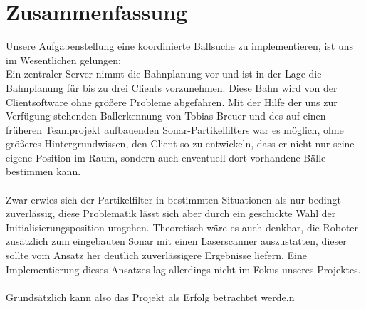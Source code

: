 
\chapter{Zusammenfassung}
\label{cha:zusammenfassung}
Unsere Aufgabenstellung eine koordinierte Ballsuche 
zu implementieren, ist uns im Wesentlichen gelungen:\\
Ein zentraler Server nimmt die Bahnplanung vor und ist in der Lage die
Bahnplanung für bis zu drei Clients vorzunehmen. Diese Bahn wird von
der Clientsoftware ohne größere Probleme abgefahren. Mit der Hilfe der
uns zur Verfügung stehenden Ballerkennung von Tobias Breuer und des
auf einen früheren Teamprojekt aufbauenden Sonar-Partikelfilters war
es möglich, ohne größeres Hintergrundwissen, den Client so zu
entwickeln, dass er nicht nur seine eigene Position im Raum, sondern
auch enventuell dort vorhandene Bälle bestimmen kann. \\\\
Zwar erwies sich der Partikelfilter in bestimmten Situationen als nur
bedingt zuverlässig, diese Problematik lässt sich aber durch ein
geschickte Wahl der Initialisierungsposition umgehen. Theoretisch wäre
es auch denkbar, die Roboter zusätzlich zum eingebauten Sonar mit
einen Laserscanner auszustatten, dieser sollte vom Ansatz her deutlich
zuverlässigere Ergebnisse liefern. Eine Implementierung dieses
Ansatzes lag allerdings nicht im Fokus unseres Projektes. \\\\
Grundsätzlich kann also das Projekt als Erfolg betrachtet werde.n
